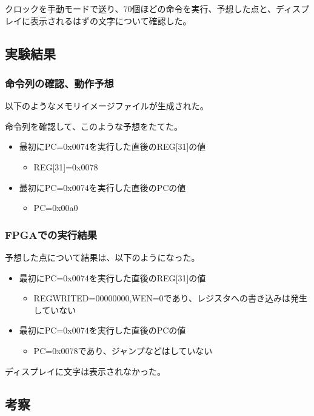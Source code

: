 クロックを手動モードで送り、70個ほどの命令を実行、予想した点と、ディスプレイに表示されるはずの文字について確認した。

\subsection{実験結果}
\subsubsection{命令列の確認、動作予想}
以下のようなメモリイメージファイルが生成された。
% 

命令列を確認して、このような予想をたてた。
\begin{itemize}
  \item 最初にPC=0x0074を実行した直後のREG[31]の値
  \begin{itemize}
    \item REG[31]=0x0078
  \end{itemize}
  \item 最初にPC=0x0074を実行した直後のPCの値
  \begin{itemize}
    \item PC=0x00a0
  \end{itemize}
\end{itemize}

\subsubsection{FPGAでの実行結果}
予想した点について結果は、以下のようになった。
\begin{itemize}
  \item 最初にPC=0x0074を実行した直後のREG[31]の値
  \begin{itemize}
    \item REGWRITED=00000000,WEN=0であり、レジスタへの書き込みは発生していない
  \end{itemize}
  \item 最初にPC=0x0074を実行した直後のPCの値
  \begin{itemize}
    \item PC=0x0078であり、ジャンプなどはしていない
  \end{itemize}
\end{itemize}

ディスプレイに文字は表示されなかった。

\subsection{考察}
